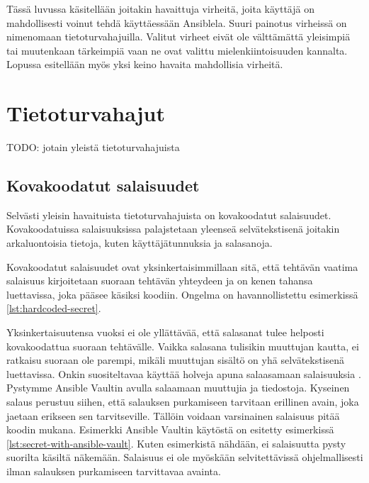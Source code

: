Tässä luvussa käsitellään joitakin havaittuja virheitä, joita käyttäjä on mahdollisesti
voinut tehdä käyttäessään Ansiblela. Suuri painotus virheissä on nimenomaan
tietoturvahajuilla. Valitut virheet eivät ole välttämättä yleisimpiä tai muutenkaan
tärkeimpiä vaan ne ovat valittu mielenkiintoisuuden kannalta. Lopussa esitellään myös
yksi keino havaita mahdollisia virheitä.

\section{Tietoturvahajut}

TODO: jotain yleistä tietoturvahajuista

\subsection{Kovakoodatut salaisuudet}

Selvästi yleisin havaituista tietoturvahajuista on kovakoodatut salaisuudet. Kovakoodatuissa
salaisuuksissa palajstetaan yleenseä selvätekstisenä joitakin arkaluontoisia tietoja, kuten
käyttäjätunnuksia ja salasanoja. \parencite{RahmanAkond2019TSSS}

Kovakoodatut salaisuudet ovat yksinkertaisimmillaan sitä, että tehtävän vaatima salaisuus
kirjoitetaan suoraan tehtävän yhteydeen ja on kenen tahansa luettavissa, joka pääsee käsiksi
koodiin. Ongelma on havannollistettu esimerkissä  \ref{lst:hardcoded-secret}.



Yksinkertaisuutensa vuoksi ei ole yllättävää, että salasanat tulee helposti kovakoodattua
suoraan tehtävälle. Vaikka salasana tulisikin muuttujan kautta, ei ratkaisu suoraan ole
parempi, mikäli muuttujan sisältö on yhä selvätekstisenä luettavissa. Onkin suositeltavaa
käyttää holveja apuna salaasamaan salaisuuksia \parencite{RahmanAkond2019TSSS}. Pystymme
Ansible Vaultin avulla salaamaan muuttujia ja tiedostoja. Kyseinen salaus perustuu siihen,
että salauksen purkamiseen tarvitaan erillinen avain, joka jaetaan erikseen sen tarvitseville.
Tällöin voidaan varsinainen salaisuus pitää koodin mukana. Esimerkki Ansible Vaultin käytöstä
on esitetty esimerkissä \ref{lst:secret-with-ansible-vault}. Kuten esimerkistä nähdään,
ei salaisuutta pysty suorilta käsiltä näkemään. Salaisuus ei ole myöskään selvitettävissä
ohjelmallisesti ilman salauksen purkamiseen tarvittavaa avainta.

